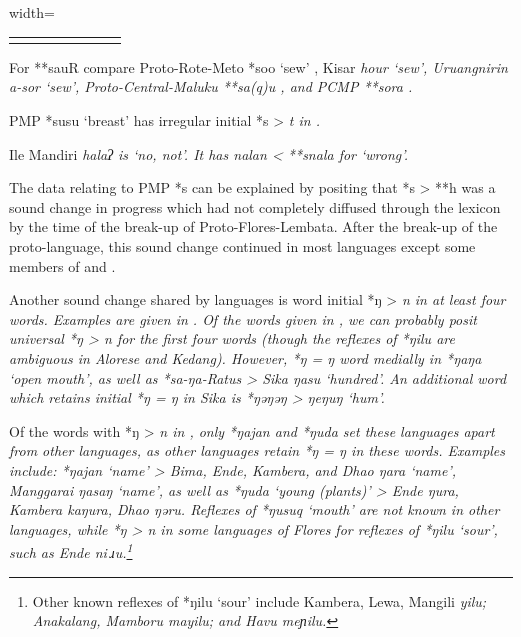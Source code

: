 \begin{table}
\begin{adjustbox}{width=\textwidth}
\begin{threeparttable}
\begin{tabular}{llllllll}
		\lspbottomrule
	\end{tabular}
		\begin{tablenotes}\tnsize
			\item[†]	{For **sauR compare Proto-Rote-Meto *soo ‘sew’ \citep[340]{Edwards2021},
								Kisar \it{hour} ‘sew’, Uruangnirin \it{a-sor} ‘sew’,
								Proto-Central-Maluku **sa(q)u \citep{Collins1983}, and PCMP **sora \citep{BlustTrussel2020}.}
			\item[‡]	{PMP *susu ‘breast’ has irregular initial *s > \it{t} in .}
			\item[Δ]	{Ile Mandiri \it{halaʔ} is ‘no, not’.
								It has \it{nalan} < **s\<n\>ala for ‘wrong’.}
		\end{tablenotes}
	\end{threeparttable}
\end{adjustbox}
\end{table}

The data relating to PMP *s can be explained by positing that
*s > **h was a sound change in progress which had not completely
diffused through the lexicon by the time of the break-up of Proto-Flores-Lembata.
After the break-up of the proto-language,
this sound change continued in most languages except some members
of  and .

Another sound change shared by  languages is word
initial *ŋ > \it{n} in at least four words.
Examples are given in .
Of the words given in ,
we can probably posit universal *ŋ > \it{n} for the first four
words (though the reflexes of *ŋilu are ambiguous in Alorese and Kedang).
However, *ŋ = \it{ŋ} word medially in *ŋaŋa ‘open mouth’,
as well as *sa-ŋa-Ratus > Sika \it{ŋasu} ‘hundred’.
An additional word which retains initial *ŋ = \it{ŋ} in Sika
is *ŋəŋəŋ > \it{ŋeŋuŋ} ‘hum’.

Of the words with *ŋ > \it{n} in ,
only *ŋajan and *ŋuda set these languages apart from other 
languages, as other  languages retain *ŋ = \it{ŋ} in these words.
Examples include: *ŋajan ‘name’ > Bima,
Ende, Kambera, and Dhao \it{ŋara} ‘name’,
Manggarai \it{ŋasaŋ} ‘name’, as well as *ŋuda ‘young (plants)’
> Ende \it{ŋura}, Kambera \it{kaŋura}, Dhao \it{ŋəru}.
Reflexes of *ŋusuq ‘mouth’ are not known in other 
languages, while *ŋ > \it{n}
in some languages of Flores for reflexes of
*ŋilu ‘sour’, such as Ende \it{ni\,ɹu}.\footnote{
		Other known reflexes of *ŋilu ‘sour’ include Kambera,
		Lewa, Mangili \it{yilu}; Anakalang, Mamboru \it{mayilu};
		and Havu \it{meɲilu}.}

